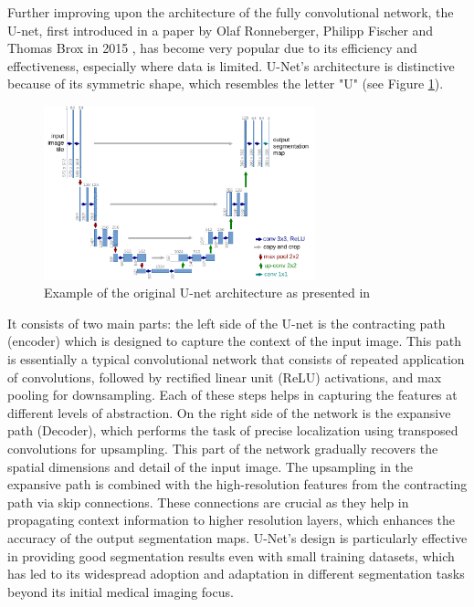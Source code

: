 \documentclass[a4paper,11pt]{article}
\begin{document}
Further improving upon the architecture of the fully convolutional network, the U-net, first introduced in a paper by Olaf Ronneberger, Philipp Fischer and Thomas Brox in 2015 \cite{DBLP:journals/corr/RonnebergerFB15}, has become very popular due to its efficiency and effectiveness, especially where data is limited. U-Net's architecture is distinctive because of its symmetric shape, which resembles the letter "U" (see Figure \ref{fig:u-netarch}). 
\begin{figure}[H]
    \centering 
    \includegraphics[width=0.7\textwidth]{u-net-illustration-correct-scale2.pdf}
    \caption{Example of the original U-net architecture as presented in \cite{DBLP:journals/corr/RonnebergerFB15}}
    \label{fig:u-netarch}
\end{figure}
It consists of two main parts: the left side of the U-net is the contracting path (encoder) which is designed to capture the context of the input image. This path is essentially a typical convolutional network that consists of repeated application of convolutions, followed by rectified linear unit (ReLU) activations, and max pooling for downsampling. Each of these steps helps in capturing the features at different levels of abstraction. On the right side of the network is the expansive path (Decoder), which performs the task of precise localization using transposed convolutions for upsampling. This part of the network gradually recovers the spatial dimensions and detail of the input image. The upsampling in the expansive path is combined with the high-resolution features from the contracting path via skip connections. These connections are crucial as they help in propagating context information to higher resolution layers, which enhances the accuracy of the output segmentation maps. U-Net's design is particularly effective in providing good segmentation results even with small training datasets, which has led to its widespread adoption and adaptation in different segmentation tasks beyond its initial medical imaging focus.
\end{document}
